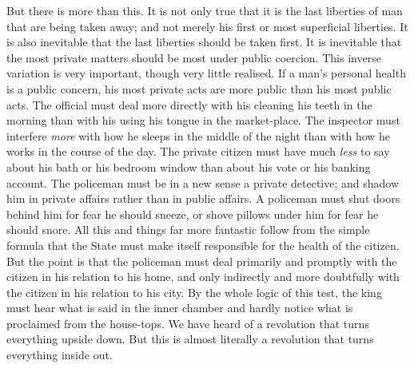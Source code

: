 \documentclass{book}
\begin{document}
But there is more than this. It is not only true that it is the last liberties of man that are being taken away; and not merely his first or most superficial liberties. It is also inevitable that the last liberties should be taken first. It is inevitable that the most private matters should be most under public coercion. This inverse variation is very important, though very little realised. If a man’s personal health is a public concern, his most private acts are more public than his most public acts. The official must deal more directly with his cleaning his teeth in the morning than with his using his tongue in the market-place. The inspector must interfere \emph{more} with how he sleeps in the middle of the night than with how he works in the course of the day. The private citizen must have much \emph{less} to say about his bath or his bedroom window than about his vote or his banking account. The policeman must be in a new sense a private detective; and shadow him in private affairs rather than in public affairs. A policeman must shut doors behind him for fear he should sneeze, or shove pillows under him for fear he should snore. All this and things far more fantastic follow from the simple formula that the State must make itself responsible for the health of the citizen. But the point is that the policeman must deal primarily and promptly with the citizen in his relation to his home, and only indirectly and more doubtfully with the citizen in his relation to his city. By the whole logic of this test, the king must hear what is said in the inner chamber and hardly notice what is proclaimed from the house-tops. We have heard of a revolution that turns everything upside down. But this is almost literally a revolution that turns everything inside out.
\end{document}
